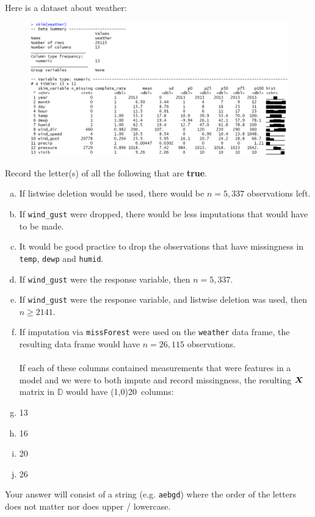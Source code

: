 \documentclass[12pt]{article}
\newcommand{\instr}{\small Your answer will consist of a string (e.g. \texttt{aebgd}) where the order of the letters does not matter nor does upper / lowercase. \normalsize}
\begin{document}

\problem [11min] Here is a dataset about weather:


\begin{figure}[htp]
\centering
\includegraphics[width=6in]{weather_data.png}
\end{figure}

\benum

 Record the letter(s) of all the following that are \textbf{true}. 


\begin{enumerate}[(a)]
\item If listwise deletion would be used, there would be $n = 5,337$ observations left.
\item If \texttt{wind\_gust} were dropped, there would be less imputations that would have to be made.
\item It would be good practice to drop the observations that have missingness in \texttt{temp}, \texttt{dewp} and \texttt{humid}.
\item If \texttt{wind\_gust} were the response variable, then $n = 5,337$.
\item If \texttt{wind\_gust} were the response variable, and listwise deletion was used, then $n \geq 2141$.
\item If imputation via \texttt{missForest} were used on the \texttt{weather} data frame, the resulting data frame would have $n = 26,115$ observations. \\~\\
If each of these columns contained measurements that were features in a model and we were to both impute and record missingness, the resulting $\boldsymbol{X}$ matrix in $\mathbb{D}$ would have \line(1,0){20}~columns:
\item 13
\item 16
\item 20
\item 26
\end{enumerate}
\eenum\instr\pagebreak
\end{document}

